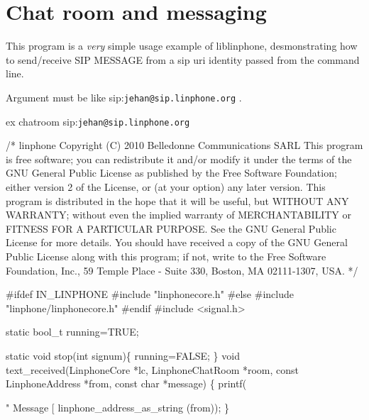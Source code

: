 \section{Chat room and messaging}
\label{group__chatroom__tuto}
This program is a {\itshape very} simple usage example of liblinphone, desmonstrating how to send/receive S\-I\-P M\-E\-S\-S\-A\-G\-E from a sip uri identity passed from the command line. \par
Argument must be like sip\-:{\tt jehan@sip.\-linphone.\-org} . \par
 ex chatroom sip\-:{\tt jehan@sip.\-linphone.\-org} \par
 
\begin{DoxyCodeInclude}

\textcolor{comment}{/*}
\textcolor{comment}{linphone}
\textcolor{comment}{Copyright (C) 2010  Belledonne Communications SARL }
\textcolor{comment}{}
\textcolor{comment}{This program is free software; you can redistribute it and/or}
\textcolor{comment}{modify it under the terms of the GNU General Public License}
\textcolor{comment}{as published by the Free Software Foundation; either version 2}
\textcolor{comment}{of the License, or (at your option) any later version.}
\textcolor{comment}{}
\textcolor{comment}{This program is distributed in the hope that it will be useful,}
\textcolor{comment}{but WITHOUT ANY WARRANTY; without even the implied warranty of}
\textcolor{comment}{MERCHANTABILITY or FITNESS FOR A PARTICULAR PURPOSE.  See the}
\textcolor{comment}{GNU General Public License for more details.}
\textcolor{comment}{}
\textcolor{comment}{You should have received a copy of the GNU General Public License}
\textcolor{comment}{along with this program; if not, write to the Free Software}
\textcolor{comment}{Foundation, Inc., 59 Temple Place - Suite 330, Boston, MA  02111-1307, USA.}
\textcolor{comment}{*/}

\textcolor{preprocessor}{#ifdef IN\_LINPHONE}
\textcolor{preprocessor}{}\textcolor{preprocessor}{#include "linphonecore.h"}
\textcolor{preprocessor}{#else}
\textcolor{preprocessor}{}\textcolor{preprocessor}{#include "linphone/linphonecore.h"}
\textcolor{preprocessor}{#endif}
\textcolor{preprocessor}{}
\textcolor{preprocessor}{#include <signal.h>}

\textcolor{keyword}{static} bool\_t running=TRUE;

\textcolor{keyword}{static} \textcolor{keywordtype}{void} stop(\textcolor{keywordtype}{int} signum)\{
        running=FALSE;
\}
\textcolor{keywordtype}{void} text\_received(LinphoneCore *lc, LinphoneChatRoom *room, \textcolor{keyword}{const} 
      LinphoneAddress *from, \textcolor{keyword}{const} \textcolor{keywordtype}{char} *message) \{
        printf(\textcolor{stringliteral}{" Message [%
      linphone_address_as_string (from));
\}


}
\end{DoxyCodeInclude}
